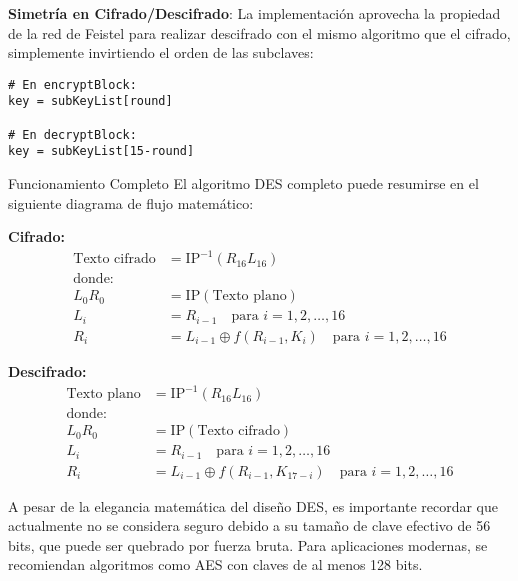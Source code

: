 \begin{securitygoodpractice}
\textbf{Simetría en Cifrado/Descifrado}: La implementación aprovecha la propiedad de la red de Feistel para realizar descifrado con el mismo algoritmo que el cifrado, simplemente invirtiendo el orden de las subclaves:

\begin{lstlisting}[style=cryptoalgo]
# En encryptBlock:
key = subKeyList[round]

# En decryptBlock:
key = subKeyList[15-round]
\end{lstlisting}
\end{securitygoodpractice}

\begin{cryptoanalysis}{Funcionamiento Completo}
El algoritmo DES completo puede resumirse en el siguiente diagrama de flujo matemático:

\textbf{Cifrado:}
\begin{align}
\text{Texto cifrado} &= \text{IP}^{-1}(R_{16}L_{16}) \\
\text{donde:} \\
L_0R_0 &= \text{IP}(\text{Texto plano}) \\
L_i &= R_{i-1} \quad \text{para } i = 1, 2, \ldots, 16 \\
R_i &= L_{i-1} \oplus f(R_{i-1}, K_i) \quad \text{para } i = 1, 2, \ldots, 16
\end{align}

\textbf{Descifrado:}
\begin{align}
\text{Texto plano} &= \text{IP}^{-1}(R_{16}L_{16}) \\
\text{donde:} \\
L_0R_0 &= \text{IP}(\text{Texto cifrado}) \\
L_i &= R_{i-1} \quad \text{para } i = 1, 2, \ldots, 16 \\
R_i &= L_{i-1} \oplus f(R_{i-1}, K_{17-i}) \quad \text{para } i = 1, 2, \ldots, 16
\end{align}
\end{cryptoanalysis}

\begin{securityalert}
A pesar de la elegancia matemática del diseño DES, es importante recordar que actualmente no se considera seguro debido a su tamaño de clave efectivo de 56 bits, que puede ser quebrado por fuerza bruta. Para aplicaciones modernas, se recomiendan algoritmos como AES con claves de al menos 128 bits.
\end{securityalert}